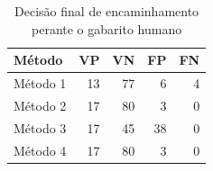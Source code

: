 \begin{table}[htbp]
\centering
\small
\caption{Decisão final de encaminhamento perante o gabarito humano}
\label{tab:handoff_matriz}
\begin{tabular}{lrrrr}
\hline
Método & VP & VN & FP & FN \\
\hline
Método 1 & 13 & 77 & 6 & 4 \\
Método 2 & 17 & 80 & 3 & 0 \\
Método 3 & 17 & 45 & 38 & 0 \\
Método 4 & 17 & 80 & 3 & 0 \\
\hline
\end{tabular}
\end{table}
